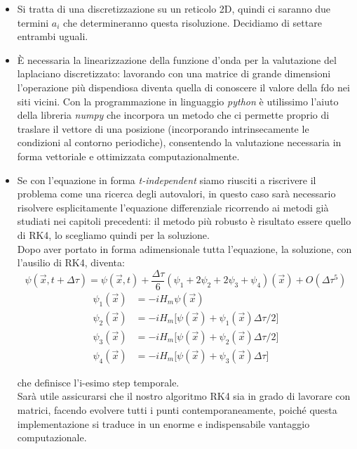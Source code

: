 \begin{itemize}
    \item Si tratta di una discretizzazione su un reticolo 2D, quindi ci saranno due termini $a_i$ che determineranno questa risoluzione. Decidiamo di settare entrambi uguali.
    \item È necessaria la linearizzazione della funzione d'onda per la valutazione del laplaciano discretizzato: lavorando con una matrice di grande dimensioni l'operazione più dispendiosa diventa quella di conoscere il valore della fdo nei siti vicini. Con la programmazione in linguaggio \textit{python} è utilissimo l'aiuto della libreria \textit{numpy} che incorpora un metodo che ci permette proprio di traslare il vettore di una posizione (incorporando intrinsecamente le condizioni al contorno periodiche), consentendo la valutazione necessaria in forma vettoriale e ottimizzata computazionalmente.
    \item Se con l'equazione in forma \textit{t-independent} siamo riusciti a riscrivere il problema come una ricerca degli autovalori, in questo caso sarà necessario risolvere esplicitamente l'equazione differenziale ricorrendo ai metodi già studiati nei capitoli precedenti: il metodo più robusto è risultato essere quello di RK4, lo scegliamo quindi per la soluzione.\\
    Dopo aver portato in forma adimensionale tutta l'equazione, la soluzione, con l'ausilio di RK4, diventa:
    \begin{equation*}
    \psi(\vec x, t+\Delta \tau) = \psi(\vec x,t ) + \frac{\Delta \tau}{6} (\psi_1 + 2 \psi_2 +2 \psi_3 + \psi_4)(\vec x) + O(\Delta \tau^5)
    \end{equation*}
    \begin{align*}
        \psi_1(\vec x) & = -i H_m \psi(\vec x) \\
        \psi_2(\vec x) & = -i H_m \big[\psi(\vec x) + \psi_1(\vec x) \Delta \tau/2 \big] \\
        \psi_3(\vec x) & = -i H_m \big[\psi(\vec x) + \psi_2(\vec x) \Delta \tau/2 \big] \\
        \psi_4(\vec x) & = -i H_m \big[\psi(\vec x) + \psi_3(\vec x) \Delta \tau \big]
    \end{align*}
    
    che definisce l'i-esimo step temporale.\\
    Sarà utile assicurarsi che il nostro algoritmo RK4 sia in grado di lavorare con matrici, facendo evolvere tutti i punti contemporaneamente, poiché questa implementazione si traduce in un enorme e indispensabile vantaggio computazionale. 
\end{itemize}


